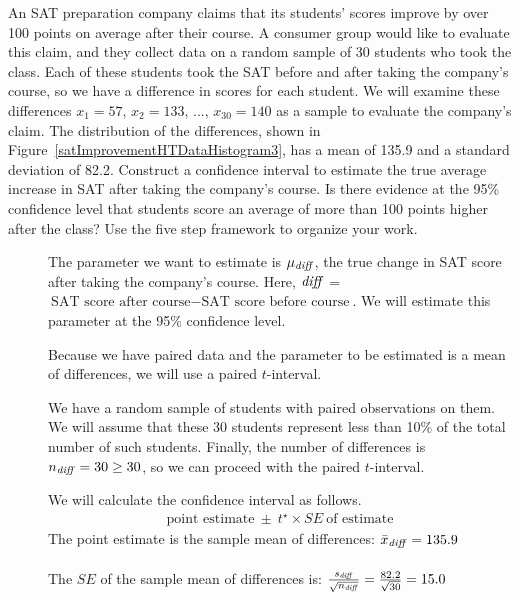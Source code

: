 \begin{examplewrap}
\begin{nexample}
{An SAT preparation company claims that its students' scores improve by over 100 points on average after their course. A consumer group would like to evaluate this claim, and they collect data on a random sample of 30 students who took the class. Each of these students took the SAT before and after taking the company's course, so we have a difference in scores for each student. We will examine these differences $x_1=57$, $x_2=133$, ..., $x_{30}=140$ as a sample to evaluate the company's claim. The distribution of the differences, shown in Figure~\ref{satImprovementHTDataHistogram3}, has a mean of 135.9 and a standard deviation of 82.2. Construct a confidence interval to estimate the true average increase in SAT after taking the company's course.  Is there evidence at the 95\% confidence level that students score an average of more than 100 points higher after the class?  Use the five step framework to organize your work.  
}
\begin{description}
\item[] The parameter we want to estimate is $\mu_{\text{\emph{diff}}}$, the true change in SAT score after taking the company's course.  Here,  ${\text{\emph{diff}}}$ = ${\text{SAT score after course} - \text{SAT score before course}}$.  We will estimate this parameter at the 95\% confidence level.

\item[] Because we have paired data and the parameter to be estimated is a mean of differences, we will use a paired $t$-interval.

\item[] We have a random sample of students with paired observations on them.  We will assume that these 30 students represent less than 10\% of the total number of such students.  Finally, the number of differences is $n_{\text{\emph{diff}}}=30\ge 30$, so we can proceed with the paired $t$-interval.  
 
\item[]  We will calculate the confidence interval as follows.
\begin{align*}
\text{point estimate}\ \pm\ t^{\star} \times SE\ \text{of estimate}
\end{align*}
The point estimate is the sample mean of differences: $\bar{x}_{\text{\emph{diff}}} = 135.9$\\
\\
The $SE$ of the sample mean of differences is: $ \frac{s_{\text{\emph{diff}}}}{\sqrt{n_{\text{\emph{diff}}}}} = \frac{82.2}{\sqrt{30}}=15.0$\\


\end{description}
\end{nexample}
\end{examplewrap}
